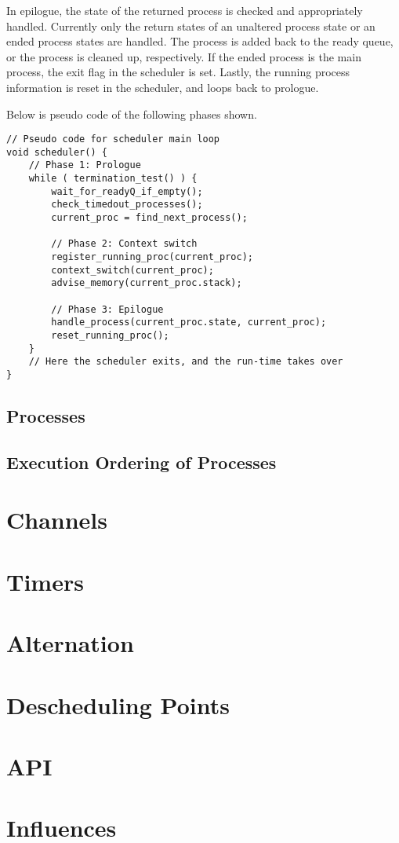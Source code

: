 In epilogue, the state of the returned process is checked and appropriately handled. Currently only the return states of an unaltered process state or an ended process states are handled. The process is added back to the ready queue, or the process is cleaned up, respectively. If the ended process is the main process, the exit flag in the scheduler is set. Lastly, the running process information is reset in the scheduler, and loops back to prologue.

Below is pseudo code of the following phases shown.

\begin{lstlisting}[style=CustomC]
// Pseudo code for scheduler main loop
void scheduler() {
    // Phase 1: Prologue
    while ( termination_test() ) {
        wait_for_readyQ_if_empty();
        check_timedout_processes();
        current_proc = find_next_process();
        
        // Phase 2: Context switch
        register_running_proc(current_proc);
        context_switch(current_proc);
        advise_memory(current_proc.stack);
        
        // Phase 3: Epilogue
        handle_process(current_proc.state, current_proc);
        reset_running_proc();      
    }
    // Here the scheduler exits, and the run-time takes over
}
\end{lstlisting}




\subsection{Processes}




\subsection{Execution Ordering of Processes}




\section{Channels}




\section{Timers}




\section{Alternation}




\section{Descheduling Points}




\section{API}




\section{Influences}




